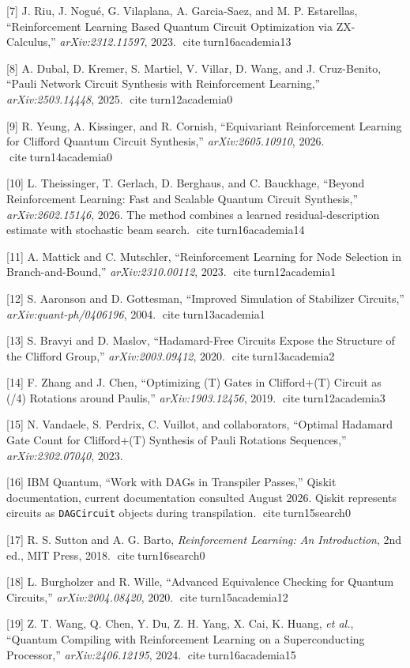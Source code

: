 \documentclass[
]{article}
\begin{document}
{[}7{]} J. Riu, J. Nogué, G. Vilaplana, A. Garcia-Saez, and M. P.
Estarellas, ``Reinforcement Learning Based Quantum Circuit Optimization
via ZX-Calculus,'' \emph{arXiv:2312.11597}, 2023.
citeturn16academia13

{[}8{]} A. Dubal, D. Kremer, S. Martiel, V. Villar, D. Wang, and J.
Cruz-Benito, ``Pauli Network Circuit Synthesis with Reinforcement
Learning,'' \emph{arXiv:2503.14448}, 2025. citeturn12academia0

{[}9{]} R. Yeung, A. Kissinger, and R. Cornish, ``Equivariant
Reinforcement Learning for Clifford Quantum Circuit Synthesis,''
\emph{arXiv:2605.10910}, 2026. citeturn14academia0

{[}10{]} L. Theissinger, T. Gerlach, D. Berghaus, and C. Bauckhage,
``Beyond Reinforcement Learning: Fast and Scalable Quantum Circuit
Synthesis,'' \emph{arXiv:2602.15146}, 2026. The method combines a
learned residual-description estimate with stochastic beam search.
citeturn16academia14

{[}11{]} A. Mattick and C. Mutschler, ``Reinforcement Learning for Node
Selection in Branch-and-Bound,'' \emph{arXiv:2310.00112}, 2023.
citeturn12academia1

{[}12{]} S. Aaronson and D. Gottesman, ``Improved Simulation of
Stabilizer Circuits,'' \emph{arXiv:quant-ph/0406196}, 2004.
citeturn13academia1

{[}13{]} S. Bravyi and D. Maslov, ``Hadamard-Free Circuits Expose the
Structure of the Clifford Group,'' \emph{arXiv:2003.09412}, 2020.
citeturn13academia2

{[}14{]} F. Zhang and J. Chen, ``Optimizing (T) Gates in Clifford+(T)
Circuit as (\pi/4) Rotations around Paulis,'' \emph{arXiv:1903.12456},
2019. citeturn12academia3

{[}15{]} N. Vandaele, S. Perdrix, C. Vuillot, and collaborators,
``Optimal Hadamard Gate Count for Clifford+(T) Synthesis of Pauli
Rotations Sequences,'' \emph{arXiv:2302.07040}, 2023.

{[}16{]} IBM Quantum, ``Work with DAGs in Transpiler Passes,'' Qiskit
documentation, current documentation consulted August 2026. Qiskit
represents circuits as \texttt{DAGCircuit} objects during transpilation.
citeturn15search0

{[}17{]} R. S. Sutton and A. G. Barto, \emph{Reinforcement Learning: An
Introduction}, 2nd ed., MIT Press, 2018. citeturn16search0

{[}18{]} L. Burgholzer and R. Wille, ``Advanced Equivalence Checking for
Quantum Circuits,'' \emph{arXiv:2004.08420}, 2020.
citeturn15academia12

{[}19{]} Z. T. Wang, Q. Chen, Y. Du, Z. H. Yang, X. Cai, K. Huang,
\emph{et al.}, ``Quantum Compiling with Reinforcement Learning on a
Superconducting Processor,'' \emph{arXiv:2406.12195}, 2024.
citeturn16academia15
\end{document}

